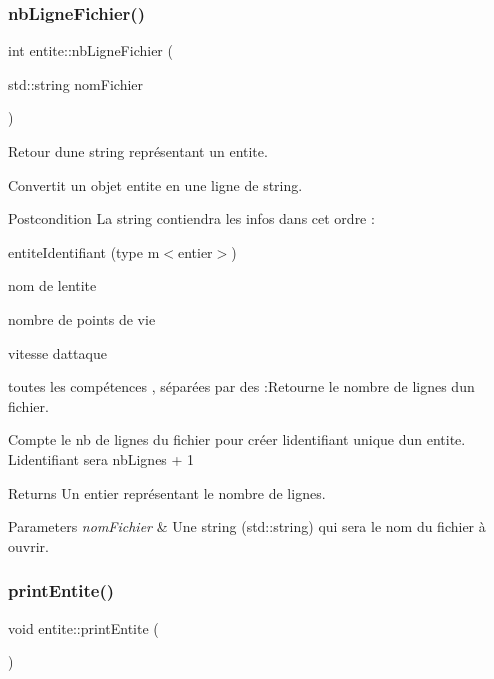 \subsubsection{\texorpdfstring{nb\+Ligne\+Fichier()}{nbLigneFichier()}}
{\footnotesize\ttfamily int entite\+::nb\+Ligne\+Fichier (\begin{DoxyParamCaption}\item[{std\+::string}]{nom\+Fichier }\end{DoxyParamCaption})}



Retour d\textquotesingle{}une string représentant un entite. 

Convertit un objet entite en une ligne de string. \begin{DoxyPostcond}{Postcondition}
La string contiendra les infos dans cet ordre \+:
\begin{DoxyItemize}
\item entite\+Identifiant (type {\ttfamily m$<$entier$>$})
\item nom de l\textquotesingle{}entite
\item nombre de points de vie
\item vitesse d\textquotesingle{}attaque
\item toutes les compétences , séparées par des {\ttfamily \+:}Retourne le nombre de lignes d\textquotesingle{}un fichier.
\end{DoxyItemize}
\end{DoxyPostcond}
Compte le nb de lignes du fichier pour créer l\textquotesingle{}identifiant unique d\textquotesingle{}un entite. L\textquotesingle{}identifiant sera {\ttfamily  nb\+Lignes + 1 } \begin{DoxyReturn}{Returns}
Un entier représentant le nombre de lignes. 
\end{DoxyReturn}

\begin{DoxyParams}{Parameters}
{\em nom\+Fichier} & Une string (std\+::string) qui sera le nom du fichier à ouvrir. \\
\hline
\end{DoxyParams}
\mbox{\label{classentite_abb1bd724598359ea2b7c3b05546d59d3}} 
\subsubsection{\texorpdfstring{print\+Entite()}{printEntite()}}
{\footnotesize\ttfamily void entite\+::print\+Entite (\begin{DoxyParamCaption}{ }\end{DoxyParamCaption})}



